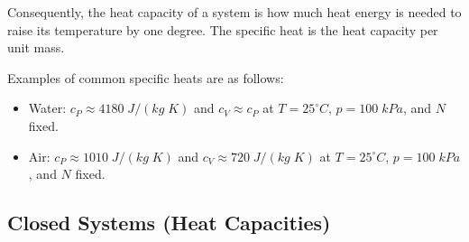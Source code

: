 \documentclass[12pt, a4paper, oneside, openright, titlepage]{book}
\begin{document}
Consequently, the heat capacity of a system is how much heat energy is needed to raise its temperature by one degree. The specific heat is the heat capacity per unit mass. 


\begin{eg}
    Examples of common specific heats are as follows: \begin{itemize}
        \item Water: $c_P \approx 4180\;J/(kg\;K)$ and $c_V \approx c_P$ at $T = 25^{\circ}C$, $p = 100\;kPa$, and $N$ fixed.
        \item Air: $c_P \approx 1010\; J/(kg\;K)$ and $c_V \approx 720\;J/(kg\;K)$ at $T = 25^{\circ}C$, $p = 100\;kPa$, and $N$ fixed.
    \end{itemize}
\end{eg}

\subsection{Closed Systems (Heat Capacities)}
\end{document}
